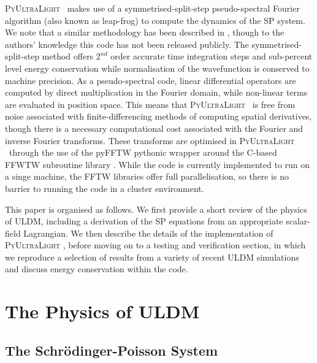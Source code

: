\documentclass[a4paper,11pt]{article}
\newcommand{\PyUltraLight}{\textsc{PyUltraLight }}
\begin{document}
\PyUltraLight\ makes use of a symmetrised-split-step pseudo-spectral Fourier algorithm (also known as leap-frog) to compute the dynamics of the SP system. We note that a similar methodology has been described in \cite{Paredes2016}, though to the authors' knowledge this code has not been released publicly. The symmetrised-split-step method offers $2^{nd}$ order accurate time integration steps and sub-percent level energy conservation while normalisation of the wavefunction is conserved to machine precision. As a pseudo-spectral code, linear differential operators are computed by direct multiplication in the Fourier domain, while non-linear terms are evaluated in position space. This means that \PyUltraLight\ is free from noise associated with finite-differencing methods of computing spatial derivatives, though there is a necessary computational cost associated with the Fourier and inverse Fourier transforms. These transforms are optimised in \PyUltraLight\ through the use of the pyFFTW pythonic wrapper around the C-based FFWTW subroutine library \cite{pyfftw} \cite{fftw}. While the code is currently implemented to run on a singe machine, the FFTW libraries offer full parallelisation, so there is no barrier to running the code in a cluster environment.  

This paper is organised as follows. We first provide a short review of the physics of ULDM, including a derivation of the SP equations from an appropriate scalar-field Lagrangian. We then describe the details of the implementation of \PyUltraLight, before moving on to a testing and verification section, in which we reproduce a selection of results from a variety of recent ULDM simulations and discuss energy conservation within the code. 


\section{The Physics of ULDM}\label{sec:physics}

\subsection{The Schr{\"o}dinger-Poisson System}
\end{document}

